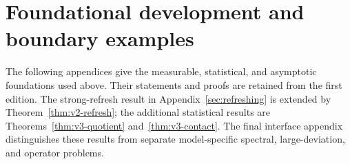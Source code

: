 \section*{Foundational development and boundary examples}
The following appendices give the measurable, statistical, and asymptotic
foundations used above. Their statements and proofs are retained from the
first edition. The strong-refresh result in Appendix~\ref{sec:refreshing}
is extended by Theorem~\ref{thm:v2-refresh}; the additional statistical
results are Theorems~\ref{thm:v3-quotient} and~\ref{thm:v3-contact}.
The final interface appendix distinguishes these results from separate
model-specific spectral, large-deviation, and operator problems.















